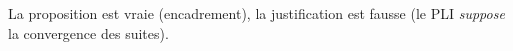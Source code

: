 La proposition est vraie (encadrement), la justification est fausse (le PLI \emph{suppose} la convergence des suites). 